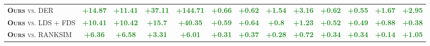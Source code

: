 \begin{table*}[h]
\begin{center}
{\begin{tabular}{l|cccc|cccc|cccc}
\textsc{\textbf{Ours} vs. DER} & \textcolor{ForestGreen}{\textbf{+14.87}} & \textcolor{ForestGreen}{\textbf{+11.41}} & \textcolor{ForestGreen}{\textbf{+37.11}} & \textcolor{ForestGreen}{\textbf{+144.71}} & \textcolor{ForestGreen}{\textbf{+0.66}} & \textcolor{ForestGreen}{\textbf{+0.62}} & \textcolor{ForestGreen}{\textbf{+1.54}} & \textcolor{ForestGreen}{\textbf{+3.16}} & \textcolor{ForestGreen}{\textbf{+0.62}} & \textcolor{ForestGreen}{\textbf{+0.55}} & \textcolor{ForestGreen}{\textbf{+1.67}} & \textcolor{ForestGreen}{\textbf{+2.95}} \\[1.5pt]
\textsc{\textbf{Ours} vs. LDS + FDS} & \textcolor{ForestGreen}{\textbf{+10.41}} & \textcolor{ForestGreen}{\textbf{+10.42}} & \textcolor{ForestGreen}{\textbf{+15.7}} & \textcolor{ForestGreen}{\textbf{+40.35}} & \textcolor{ForestGreen}{\textbf{+0.59}} & \textcolor{ForestGreen}{\textbf{+0.64}} & \textcolor{ForestGreen}{\textbf{+0.8}} & \textcolor{ForestGreen}{\textbf{+1.23}} & \textcolor{ForestGreen}{\textbf{+0.52}} & \textcolor{ForestGreen}{\textbf{+0.49}} & \textcolor{ForestGreen}{\textbf{+0.88}} & \textcolor{ForestGreen}{\textbf{+0.38}} \\[1.5pt]
\textsc{\textbf{Ours} vs. RANKSIM} & \textcolor{ForestGreen}{\textbf{+6.36}} & \textcolor{ForestGreen}{\textbf{+6.58}} & \textcolor{ForestGreen}{\textbf{+3.31}} & \textcolor{ForestGreen}{\textbf{+6.01}} & \textcolor{ForestGreen}{\textbf{+0.31}} & \textcolor{ForestGreen}{\textbf{+0.37}} & \textcolor{ForestGreen}{\textbf{+0.28}} & \textcolor{ForestGreen}{\textbf{+0.72}} & \textcolor{ForestGreen}{\textbf{+0.34}} & \textcolor{ForestGreen}{\textbf{+0.34}} & \textcolor{ForestGreen}{\textbf{+0.14}} & \textcolor{ForestGreen}{\textbf{+1.05}} \\
\bottomrule[1.5pt]
\end{tabular}}
\end{center}
\vspace{-0.6cm}
\end{table*}
%
